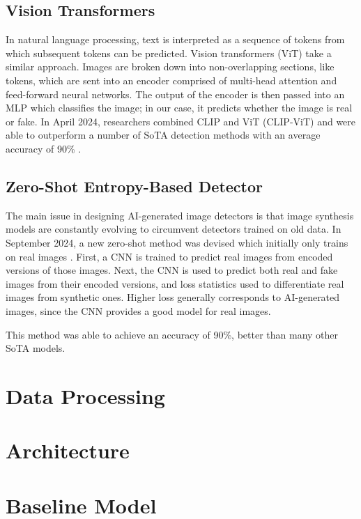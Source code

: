 \documentclass{article} %
\begin{document}
\subsection{Vision Transformers}

In natural language processing, text is interpreted as a sequence of tokens from which subsequent tokens can be predicted. Vision transformers (ViT) take a similar approach. Images are broken down into non-overlapping sections, like tokens, which are sent into an encoder comprised of multi-head attention and feed-forward neural networks. The output of the encoder is then passed into an MLP which classifies the image; in our case, it predicts whether the image is real or fake. In April 2024, researchers combined CLIP and ViT (CLIP-ViT) and were able to outperform a number of SoTA detection methods with an average accuracy of 90\% \citep{cozzolino2024raisingbaraigeneratedimage}.

\subsection{Zero-Shot Entropy-Based Detector}
\label{ZED}

The main issue in designing AI-generated image detectors is that image synthesis models are constantly evolving to circumvent detectors trained on old data. In September 2024, a new zero-shot method was devised which initially only trains on real images \citep{cozzolino2024zeroshotdetectionaigeneratedimages}. First, a CNN is trained to predict real images from encoded versions of those images. Next, the CNN is used to predict both real and fake images from their encoded versions, and loss statistics used to differentiate real images from synthetic ones. Higher loss generally corresponds to AI-generated images, since the CNN provides a good model for real images.

This method was able to achieve an accuracy of 90\%, better than many other SoTA models.

\section{Data Processing}



\section{Architecture}



\section{Baseline Model}
\end{document}
